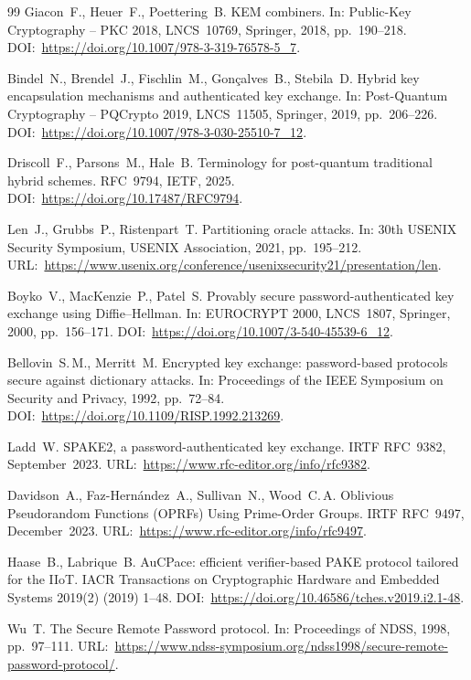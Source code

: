 \documentclass{ieeeijc}
\theoremstyle{remark}
\begin{document}
\begin{thebibliography}{99}
Giacon~F., Heuer~F., Poettering~B.
KEM combiners.
In: Public-Key Cryptography -- PKC 2018, LNCS~10769, Springer, 2018, pp.~190--218.
DOI:~\url{https://doi.org/10.1007/978-3-319-76578-5_7}.

Bindel~N., Brendel~J., Fischlin~M., Gon\c{c}alves~B., Stebila~D.
Hybrid key encapsulation mechanisms and authenticated key exchange.
In: Post-Quantum Cryptography -- PQCrypto 2019, LNCS~11505, Springer, 2019, pp.~206--226.
DOI:~\url{https://doi.org/10.1007/978-3-030-25510-7_12}.

Driscoll~F., Parsons~M., Hale~B.
Terminology for post-quantum traditional hybrid schemes.
RFC~9794, IETF, 2025.
DOI:~\url{https://doi.org/10.17487/RFC9794}.

Len~J., Grubbs~P., Ristenpart~T.
Partitioning oracle attacks.
In: 30th USENIX Security Symposium, USENIX Association, 2021, pp.~195--212.
URL:~\url{https://www.usenix.org/conference/usenixsecurity21/presentation/len}.

Boyko~V., MacKenzie~P., Patel~S.
Provably secure password-authenticated key exchange using Diffie--Hellman.
In: EUROCRYPT 2000, LNCS~1807, Springer, 2000, pp.~156--171.
DOI:~\url{https://doi.org/10.1007/3-540-45539-6_12}.

Bellovin~S.\,M., Merritt~M.
Encrypted key exchange: password-based protocols secure against dictionary attacks.
In: Proceedings of the IEEE Symposium on Security and Privacy, 1992, pp.~72--84.
DOI:~\url{https://doi.org/10.1109/RISP.1992.213269}.

Ladd~W.
SPAKE2, a password-authenticated key exchange.
IRTF RFC~9382, September~2023.
URL:~\url{https://www.rfc-editor.org/info/rfc9382}.

Davidson~A., Faz-Hern\'{a}ndez~A., Sullivan~N., Wood~C.\,A.
Oblivious Pseudorandom Functions (OPRFs) Using Prime-Order Groups.
IRTF RFC~9497, December~2023.
URL:~\url{https://www.rfc-editor.org/info/rfc9497}.

Haase~B., Labrique~B.
AuCPace: efficient verifier-based PAKE protocol tailored for the IIoT.
IACR Transactions on Cryptographic Hardware and Embedded Systems 2019(2) (2019) 1--48.
DOI:~\url{https://doi.org/10.46586/tches.v2019.i2.1-48}.

Wu~T.
The Secure Remote Password protocol.
In: Proceedings of NDSS, 1998, pp.~97--111.
URL:~\url{https://www.ndss-symposium.org/ndss1998/secure-remote-password-protocol/}.


\end{thebibliography}
\end{document}
